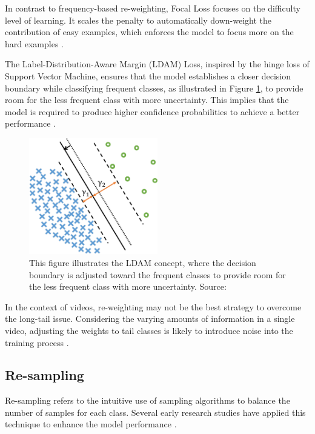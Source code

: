 In contrast to frequency-based re-weighting, Focal Loss focuses on the difficulty level of learning. It scales the penalty to automatically down-weight the contribution of easy examples, which enforces the model to focus more on the hard examples \parencite{lin2017focal}.

The Label-Distribution-Aware Margin (LDAM) Loss, inspired by the hinge loss of Support Vector Machine, ensures that the model establishes a closer decision boundary while classifying frequent classes, as illustrated in Figure \ref{fig:concetpldam}, to provide room for the less frequent class with more uncertainty. This implies that the model is required to produce higher confidence probabilities to achieve a better performance \parencite{cao2019learning}.

\begin{figure}[ht]
    \centering
    \includegraphics[width=0.5\textwidth]{assets/charts_rw/LDAM}
    \caption[Conceptual Illustration of LDAM]{This figure illustrates the LDAM concept, where the decision boundary is adjusted toward the frequent classes to provide room for the less frequent class with more uncertainty. Source: \parencite{cao2019learning}}
    \label{fig:concetpldam}
\end{figure}

In the context of videos, re-weighting may not be the best strategy to overcome the long-tail issue. Considering the varying amounts of information in a single video, adjusting the weights to tail classes is likely to introduce noise into the training process \parencite{zhang2021videolt}.

\subsection{Re-sampling}
Re-sampling refers to the intuitive use of sampling algorithms to balance the number of samples for each class. Several early research studies have applied this technique to enhance the model performance \parencite{shen2016relay, 5128907, mahajan2018exploring}.


